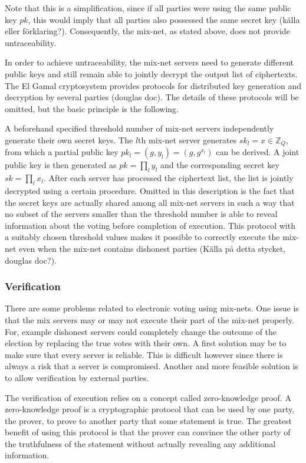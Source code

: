 Note that this is a simplification, since if all parties were using
the same public key $pk$, this would imply that all parties also
possessed the same secret key (källa eller förklaring?). Consequently,
the mix-net, as stated above, does not provide untraceability.

In order to achieve untraceability, the mix-net servers need to
generate different public keys and still remain able to jointly
decrypt the output list of ciphertexts. The El Gamal cryptosystem
provides protocols for distributed key generation and decryption by
several parties (douglas doc). The details of these protocols will be
omitted, but the basic principle is the following.

A beforehand specified threshold number of mix-net servers
independently generate their own secret keys. The $l$th mix-net server
generates $sk_l = x \in \mathbb{Z}_Q$, from which a partial public key
$pk_l = (g,y_l) = (g,g^{x_l})$ can be derived. A joint public key is
then generated as $pk = \prod_l y_l$ and the corresponding secret key
$sk = \prod_l x_l$. After each server has processed the ciphertext
list, the list is jointly decrypted using a certain procedure. Omitted
in this description is the fact that the secret keys are actually
shared among all mix-net servers in such a way that no subset of the
servers smaller than the threshold number is able to reveal
information about the voting before completion of execution. This
protocol with a suitably chosen threshold values makes it possible to
correctly execute the mix-net even when the mix-net contains dishonest
parties (Källa på detta stycket, douglas doc?).

\subsubsection{Verification}
There are some problems related to electronic voting using
mix-nets. One issue is that the mix servers may or may not execute
their part of the mix-net properly. For, example dishonest servers
could completely change the outcome of the election by replacing the
true votes with their own. A first solution may be to make sure that
every server is reliable. This is difficult however since there is always a risk that a server is compromised. Another and more feasible solution is to allow
verification by external parties.

The verification of execution relies on a concept called
zero-knowledge proof. A zero-knowledge proof is a cryptographic
protocol that can be used by one party, the prover, to prove to
another party that some statement is true. The greatest benefit of
using this protocol is that the prover can convince the other party of
the truthfulness of the statement without actually revealing any
additional information.

